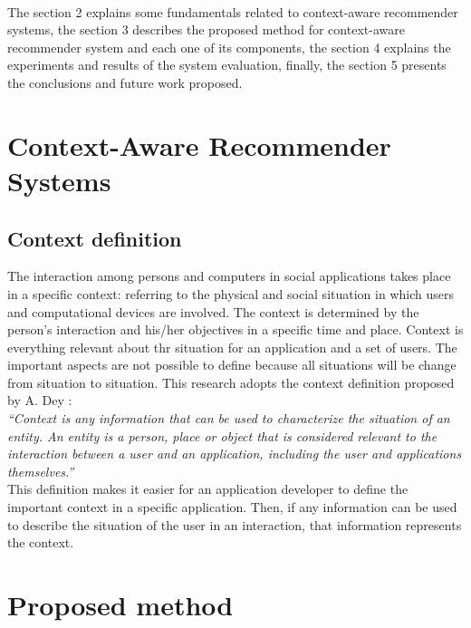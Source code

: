 \\ The
section 2 explains some fundamentals related to context-aware recommender
systems, the section 3 describes the proposed method for context-aware
recommender system and each one of its components, the section 4 explains the
experiments  and results of the system evaluation, finally, the section 5
presents the conclusions and future work proposed.



\section{Context-Aware Recommender Systems } \label{sec:2} 
\subsection{Context definition} \label{sec:2.1}  

The interaction among persons and computers in social applications takes place
in a specific context: referring to the physical and social situation in which
users and computational devices are involved. The context is determined by the person’s
interaction and his/her objectives in a specific time and place.
Context is everything relevant about thr situation for an
application and a set of users. The important aspects are not possible to
define because all situations will be change from situation to situation. This
research adopts the context definition proposed by A. Dey
\cite{dey2001understanding}:\\ \textit{``Context is any information that can be
used to characterize the situation of an entity. An entity is a person, place or
object that is considered relevant to the interaction between a user and an
application, including the user and applications themselves.''}\\ This
definition makes it easier for an application developer to define the important
context in a specific application. Then, if any information can be used to
describe the situation of the user in an interaction, that information
represents the context.




\section{Proposed method}\label{sec:3}
